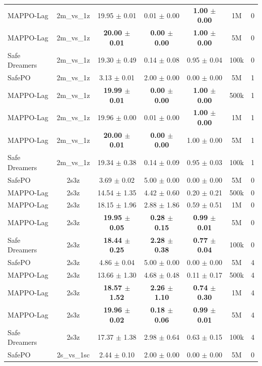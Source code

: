 \documentclass{article}
\begin{document}
\begin{longtable}{lcccccc}
MAPPO-Lag & 2m\_vs\_1z & 19.95 $\pm$ 0.01 & 0.01 $\pm$ 0.00 & \textbf{1.00 $\pm$ 0.00} & 1M & 0 \\
MAPPO-Lag & 2m\_vs\_1z & \textbf{20.00 $\pm$ 0.01} & \textbf{0.00 $\pm$ 0.00} & \textbf{1.00 $\pm$ 0.00} & 5M & 0 \\
Safe Dreamers & 2m\_vs\_1z & 19.30 $\pm$ 0.49 & 0.14 $\pm$ 0.08 & 0.95 $\pm$ 0.04 & 100k & 0 \\
\midrule
SafePO & 2m\_vs\_1z & 3.13 $\pm$ 0.01 & 2.00 $\pm$ 0.00 & 0.00 $\pm$ 0.00 & 5M & 1 \\
MAPPO-Lag & 2m\_vs\_1z & \textbf{19.99 $\pm$ 0.01} & \textbf{0.00 $\pm$ 0.00} & \textbf{1.00 $\pm$ 0.00} & 500k & 1 \\
MAPPO-Lag & 2m\_vs\_1z & 19.96 $\pm$ 0.00 & 0.01 $\pm$ 0.00 & \textbf{1.00 $\pm$ 0.00} & 1M & 1 \\
MAPPO-Lag & 2m\_vs\_1z & \textbf{20.00 $\pm$ 0.01} & \textbf{0.00 $\pm$ 0.00} & 1.00 $\pm$ 0.00 & 5M & 1 \\
Safe Dreamers & 2m\_vs\_1z & 19.34 $\pm$ 0.38 & 0.14 $\pm$ 0.09 & 0.95 $\pm$ 0.03 & 100k & 1 \\
\midrule
SafePO & 2s3z & 3.69 $\pm$ 0.02 & 5.00 $\pm$ 0.00 & 0.00 $\pm$ 0.00 & 5M & 0 \\
MAPPO-Lag & 2s3z & 14.54 $\pm$ 1.35 & 4.42 $\pm$ 0.60 & 0.20 $\pm$ 0.21 & 500k & 0 \\
MAPPO-Lag & 2s3z & 18.15 $\pm$ 1.96 & 2.88 $\pm$ 1.86 & 0.59 $\pm$ 0.51 & 1M & 0 \\
MAPPO-Lag & 2s3z & \textbf{19.95 $\pm$ 0.05} & \textbf{0.28 $\pm$ 0.15} & \textbf{0.99 $\pm$ 0.01} & 5M & 0 \\
Safe Dreamers & 2s3z & \textbf{18.44 $\pm$ 0.25} & \textbf{2.28 $\pm$ 0.38} & \textbf{0.77 $\pm$ 0.04} & 100k & 0 \\
\midrule
SafePO & 2s3z & 4.86 $\pm$ 0.04 & 5.00 $\pm$ 0.00 & 0.00 $\pm$ 0.00 & 5M & 4 \\
MAPPO-Lag & 2s3z & 13.66 $\pm$ 1.30 & 4.68 $\pm$ 0.48 & 0.11 $\pm$ 0.17 & 500k & 4 \\
MAPPO-Lag & 2s3z & \textbf{18.57 $\pm$ 1.52} & \textbf{2.26 $\pm$ 1.10} & \textbf{0.74 $\pm$ 0.30} & 1M & 4 \\
MAPPO-Lag & 2s3z & \textbf{19.96 $\pm$ 0.02} & \textbf{0.18 $\pm$ 0.06} & \textbf{0.99 $\pm$ 0.01} & 5M & 4 \\
Safe Dreamers & 2s3z & 17.37 $\pm$ 1.38 & 2.98 $\pm$ 0.64 & 0.63 $\pm$ 0.15 & 100k & 4 \\
\midrule
SafePO & 2s\_vs\_1sc & 2.44 $\pm$ 0.10 & 2.00 $\pm$ 0.00 & 0.00 $\pm$ 0.00 & 5M & 0 \\

\end{longtable}
\end{document}
